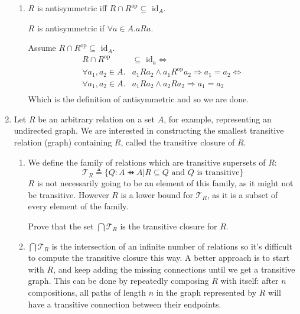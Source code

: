 \documentclass[10pt,\jkfside,a4paper]{article}
\begin{document}
\begin{enumerate}
\begin{enumerate}
\item $R$ is antisymmetric iff $R \cap R^{\text{op}} \subseteq \text{ id}_A$.

$R$ is antisymmetric if $\forall a \in A. a R a$.

Assume $R \cap R^{\text{op}} \subseteq \text{ id}_A$.
\begin{equation}
\begin{split}
R \cap R^{\text{op}} &\subseteq \text{ id}_a \Longleftrightarrow \\
\forall a_1, a_2 \in A. &a_1 R a_2 \wedge a_1 R^{\text{op}} a_2 \Longrightarrow a_1 = a_2 \Longleftrightarrow \\
\forall a_1, a_2 \in A. &a_1 R a_2 \wedge a_2 R a_2 \Longrightarrow a_1 = a_2 \\
\end{split}
\end{equation}
Which is the definition of antisymmetric and so we are done.

\end{enumerate}

\item Let $R$ be an arbitrary relation on a set $A$, for example, representing an undirected graph.
We are interested in constructing the smallest transitive relation (graph) containing $R$, called the 
transitive closure of $R$.

\begin{enumerate}

\item We define the family of relations which are transitive supersets of $R$:
\begin{equation}
\mathcal{T}_R \triangleq \{Q: A \pfun A | R \subseteq Q \text{ and } Q \text{ is transitive}\}
\end{equation}
$R$ is not necessarily going to be an element of this family, as it might not be transitive.
However $R$ is a lower bound for $\mathcal{T}_R$, as it is a subset of every element of the family.

Prove that the set $\bigcap \mathcal{T}_R$ is the transitive closure for $R$.



\item $\bigcap \mathcal{T}_R$ is the intersection of an infinite number of relations so it's difficult 
to compute the transitive closure this way. A better approach is to start with $R$, and keep adding the 
missing connections until we get a transitive graph. This can be done by repeatedly composing $R$ with 
itself: after $n$ compositions, all paths of length $n$ in the graph represented by $R$ will have a 
transitive connection between their endpoints.


\end{enumerate}
\end{enumerate}
\end{document}
